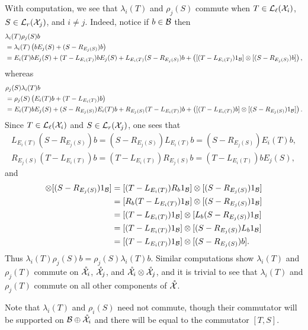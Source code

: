 With computation, we see that $\lambda_i(T)$ and $\rho_j(S)$ commute when $T \in \mathcal{L}_{\ell}(\mathcal{X}_i)$, $S \in \mathcal{L}_r(\mathcal{X}_j)$, and $i \neq j$.
Indeed, notice if $b \in \mathcal{B}$ then
\begin{align*}
	& \lambda_i(T) \rho_j(S) b \\
	&= \lambda_i(T) \left(b E_j(S) + (S-R_{E_j(S)}) b
	\right) \\
	&= E_{i}(T)bE_j(S) + (T-L_{E_i(T)})bE_j(S) + L_{E_i(T)}(S-R_{E_j(S)}) b
	+ \left([(T-L_{E_{i}(T)})1_{\mathcal{B}}] \otimes [(S-R_{E_j(S)}) b]
	\right),
\end{align*}
whereas
\begin{align*}
	&
	\rho_j(S) \lambda_i(T)b \\
	&= \rho_j(S) \left( E_{i}(T)b + (T-L_{E_i(T)})b\right) \\
	&= E_{i}(T)b E_j(S) + (S-R_{E_j(S)})E_{i}(T)b +
	R_{E_j(S)} (T-L_{E_i(T)})b +
	\left([(T-L_{E_{i}(T)})b] \otimes [(S-R_{E_j(S)}) 1_{\mathcal{B}}]
	\right).
\end{align*}
Since $T \in \mathcal{L}_{\ell}(\mathcal{X}_i)$ and $S \in \mathcal{L}_r(\mathcal{X}_j)$, one sees that
\begin{align*}
	L_{E_i(T)}(S-R_{E_j(S)}) b = (S-R_{E_j(S)})L_{E_i(T)} b = (S-R_{E_j(S)})E_i(T) b,\\
	R_{E_j(S)} (T-L_{E_i(T)})b = (T-L_{E_i(T)}) R_{E_j(S)} b =
	(T-L_{E_i(T)})bE_j(S),
\end{align*}
and
\begin{align*}
	[(T-L_{E_{i}(T)})b] \otimes [(S-R_{E_j(S)}) 1_\cB] & = [(T-L_{E_{i}(T)})R_b 1_\cB] \otimes [(S-R_{E_j(S)}) 1_\cB] \\
	& = [R_b(T-L_{E_{i}(T)}) 1_\cB] \otimes [(S-R_{E_j(S)}) 1_\cB] \\
	& = [(T-L_{E_{i}(T)}) 1_\cB] \otimes [L_b(S-R_{E_j(S)}) 1_\cB] \\
	& = [(T-L_{E_{i}(T)}) 1_\cB] \otimes [(S-R_{E_j(S)}) L_b1_\cB] \\
	& = [(T-L_{E_{i}(T)})1_\cB] \otimes [(S-R_{E_j(S)}) b] .
\end{align*}
Thus $\lambda_i(T) \rho_j(S) b = \rho_j(S) \lambda_i(T) b$.
Similar computations show $\lambda_i(T)$ and $\rho_j(T)$ commute on $\mathring{\mathcal{X}}_i$, $\mathring{\mathcal{X}}_j$, and $\mathring{\mathcal{X}}_i \otimes \mathring{\mathcal{X}}_j$, and it is trivial to see that $\lambda_i(T)$ and $\rho_j(T)$ commute on all other components of $\mathring{\mathcal{X}}$.

Note that $\lambda_i(T)$ and $\rho_i(S)$ need not commute, though their commutator will be supported on $\mathcal{B} \oplus \mathring{\mathcal{X}}_i$ and there will be equal to the commutator $[T, S]$.










